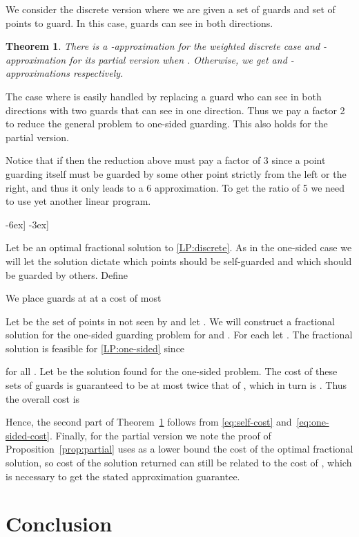 \documentclass[11pt]{article}
\newtheorem{theorem}{Theorem}
\begin{document}
We consider the discrete version where we are given a set of guards  and
set of points  to guard. In this case, guards can see in both directions.

\begin{theorem} \label{thm:discrete}
  There is a -approximation for the weighted discrete case and -approximation for its partial version when . Otherwise, we get  and -approximations respectively.
\end{theorem}

The case where  is easily handled by replacing a guard
who can see in both directions with two guards that can see in one
direction. Thus we pay a factor 2 to reduce the general problem to one-sided
guarding. This also holds for the partial version.

Notice that if  then the reduction above must pay a
factor of 3 since a point guarding itself must be guarded by some other point
strictly from the left or the right, and thus it only leads to a 6
approximation. To get the ratio of 5 we need to use yet another linear
program.

-6ex] \notag
-3ex]


Let  be an optimal fractional solution to \eqref{LP:discrete}. As in the
one-sided case we will let the solution  dictate which points should be
self-guarded and which should be guarded by others. Define


We place guards at  at a cost of most


Let  be the set of points in  not seen by  and let . We will construct a fractional solution for the one-sided
guarding problem for  and . For each 
let . The fractional solution  is
feasible for \eqref{LP:one-sided} since

for all .
Let  be the solution found for the one-sided problem. The
cost of these sets of guards is guaranteed to be at most twice that of ,
which in turn is . Thus the overall cost is


Hence, the second part of Theorem~\ref{thm:discrete} follows from
\eqref{eq:self-cost} and~\eqref{eq:one-sided-cost}. Finally, for the partial
version we note the proof of Proposition~\ref{prop:partial} uses as a lower
bound the cost of the optimal fractional solution, so cost of the solution
returned can still be related to the cost of , which is necessary to get
the stated approximation guarantee.

\section{Conclusion}
\end{document}

